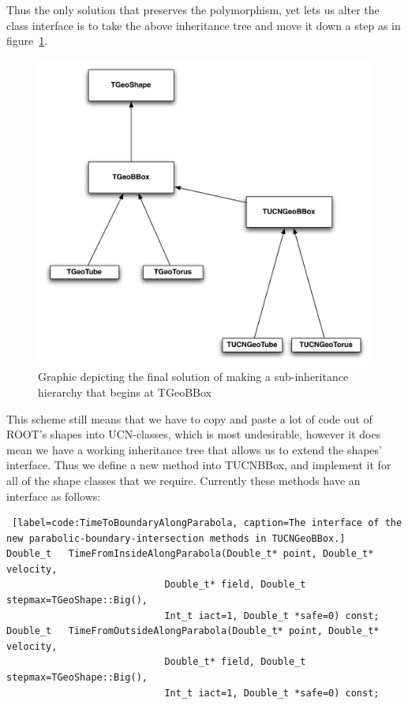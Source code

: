\documentclass[11pt,a4paper,oneside]{article}
\begin{document}
Thus the only solution that preserves the polymorphism, yet lets us alter the class interface is to take the above inheritance tree and move it down a step as in figure~\ref{fig:UCNShapeInheritance}. 

\begin{figure}[!htbp] 
\begin{center}
\includegraphics[scale=0.5]{designdocumentimages/UCNShapeInheritance}
\end{center}
\caption{Graphic depicting the final solution of making a sub-inheritance hierarchy that begins at TGeoBBox}
\label{fig:UCNShapeInheritance}
\end{figure}

This scheme still means that we have to copy and paste a lot of code out of ROOT's shapes into UCN-classes, which is most undesirable, however it does mean we have a working inheritance tree that allows us to extend the shapes' interface. Thus we define a new method into TUCNBBox, and implement it for all of the shape classes that we require. Currently these methods have an interface as follows: 

\begin{sourcecode} 
\begin{lstlisting} [label=code:TimeToBoundaryAlongParabola, caption=The interface of the new parabolic-boundary-intersection methods in TUCNGeoBBox.]
Double_t   TimeFromInsideAlongParabola(Double_t* point, Double_t* velocity, 
							Double_t* field, Double_t stepmax=TGeoShape::Big(), 
							Int_t iact=1, Double_t *safe=0) const;
Double_t   TimeFromOutsideAlongParabola(Double_t* point, Double_t* velocity,
	 						Double_t* field, Double_t stepmax=TGeoShape::Big(),
	 						Int_t iact=1, Double_t *safe=0) const;
\end{lstlisting} 
\end{sourcecode}
\end{document}

